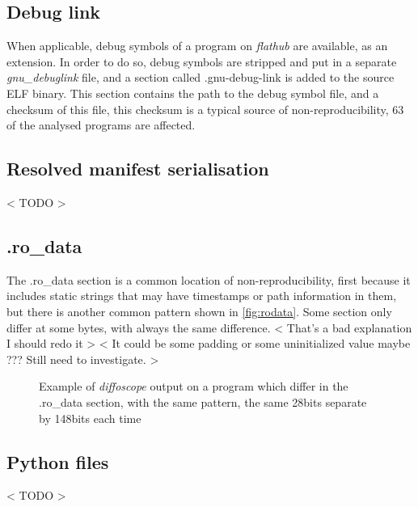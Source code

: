 \documentclass[a4paper,11pt,oneside]{report}
\theoremstyle{definition}
\newcommand{\fh}{\emph{flathub}\xspace}
\newcommand{\dfc}{\emph{diffoscope}\xspace}
\begin{document}
\subsection{Debug link}
When applicable, debug symbols of a program on \fh are available, as an
extension. In order to do so, debug symbols are stripped and put in a separate
\emph{gnu\_debuglink} file, and a section called .gnu-debug-link is added to the
source ELF binary. This section contains the path to the debug symbol file, and
a checksum of this file, this checksum is a typical source of
non-reproducibility, 63 of the analysed programs are affected.


\subsection{Resolved manifest serialisation}
< TODO >

\subsection{.ro\_data}
The .ro\_data section is a common location of non-reproducibility, first
because it includes static strings that may have timestamps or path information
in them, but there is another common pattern shown in \autoref{fig:rodata}.
Some section only differ at some bytes, with always the same difference.
< That's a bad explanation I should redo it >
< It could be some padding or some uninitialized value maybe ??? Still need to investigate. >
\begin{figure}[h]
    \caption{Example of \dfc output on a program which differ in the .ro\_data section, with the same pattern, the same 28bits separate by 148bits each time}
    \label{fig:rodata}
\end{figure}

\subsection{Python files}
< TODO >
\end{document}

